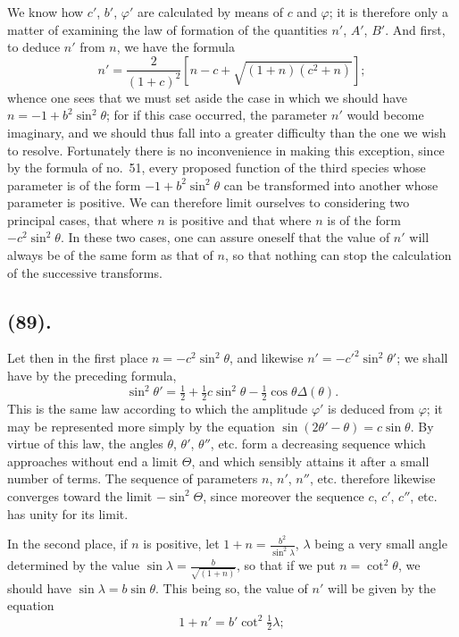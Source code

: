 \documentclass{article}
\begin{document}
We know how $c'$, $b'$, $\varphi'$ are calculated by means of $c$ and $\varphi$; it is therefore only a matter of examining the law of formation of the quantities $n'$, $A'$, $B'$. And first, to deduce $n'$ from $n$, we have the formula
\[ n'=\frac{2}{(1+c)^{2}}[n-c+\sqrt{(1+n)(c^{2}+n)}]; \]
whence one sees that we must set aside the case in which we should have $n=-1+b^{2}\sin^{2}\theta$; for if this case occurred, the parameter $n'$ would become imaginary, and we should thus fall into a greater difficulty than the one we wish to resolve. Fortunately there is no inconvenience in making this exception, since by the formula of no.~51, every proposed function of the third species whose parameter is of the form $-1+b^{2}\sin^{2}\theta$ can be transformed into another whose parameter is positive. We can therefore limit ourselves to considering two principal cases, that where $n$ is positive and that where $n$ is of the form $-c^{2}\sin^{2}\theta$. In these two cases, one can assure oneself that the value of $n'$ will always be of the same form as that of $n$, so that nothing can stop the calculation of the successive transforms.

\subsection*{(89).}

Let then in the first place $n=-c^{2}\sin^{2}\theta$, and likewise $n'=-c'^{2}\sin^{2}\theta'$; we shall have by the preceding formula,
\[ \sin^{2}\theta'=\tfrac{1}{2}+\tfrac{1}{2}c\sin^{2}\theta-\tfrac{1}{2}\cos\theta\Delta(\theta). \]
This is the same law according to which the amplitude $\varphi'$ is deduced from $\varphi$; it may be represented more simply by the equation $\sin(2\theta'-\theta)=c\sin\theta$. By virtue of this law, the angles $\theta$, $\theta'$, $\theta''$, etc. form a decreasing sequence which approaches without end a limit $\Theta$, and which sensibly attains it after a small number of terms. The sequence of parameters $n$, $n'$, $n''$, etc. therefore likewise converges toward the limit $-\sin^{2}\Theta$, since moreover the sequence $c$, $c'$, $c''$, etc. has unity for its limit.

In the second place, if $n$ is positive, let $1+n=\frac{b^{2}}{\sin^{2}\lambda}$, $\lambda$ being a very small angle determined by the value $\sin\lambda=\frac{b}{\sqrt{(1+n)}}$, so that if we put $n=\cot^{2}\theta$, we should have $\sin\lambda=b\sin\theta$. This being so, the value of $n'$ will be given by the equation
\[ 1+n'=b'\cot^{2}\tfrac{1}{2}\lambda; \]
\end{document}
